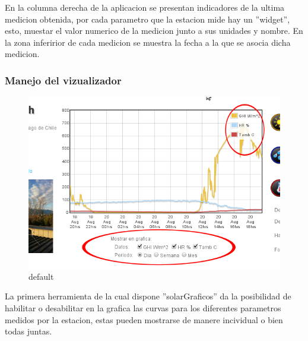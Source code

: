 En la columna derecha de la aplicacion se presentan indicadores de la ultima medicion obtenida, por cada parametro que la estacion mide hay un ''widget'', esto, muestar el valor numerico de la medicion junto a sus unidades y nombre. En la zona inferirior de cada medicion se muestra la fecha a la que se asocia dicha medicion.

\subsubsection{Manejo del vizualizador}
\begin{figure}[ht]
        \centering
        \includegraphics[width=\textwidth]{./images/cap5chap1img1}
        \caption{default}
        \label{fig:figure1}
\end{figure}
La primera herramienta de la cual dispone ''solarGraficos'' da la posibilidad de habilitar o desabilitar en la grafica las curvas para los diferentes parametros medidos por la estacion, estas pueden mostrarse de manere incividual o bien todas juntas.

